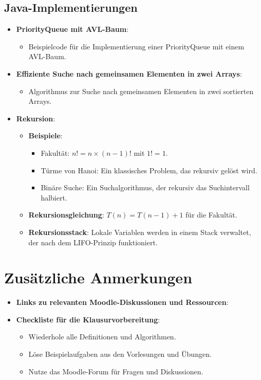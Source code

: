 \documentclass[a4paper,12pt]{article}
\begin{document}
\subsection{Java-Implementierungen}
\begin{itemize}
    \item \textbf{PriorityQueue mit AVL-Baum}:
    \begin{itemize}
        \item Beispielcode für die Implementierung einer PriorityQueue mit einem AVL-Baum.
    \end{itemize}
    \item \textbf{Effiziente Suche nach gemeinsamen Elementen in zwei Arrays}:
    \begin{itemize}
        \item Algorithmus zur Suche nach gemeinsamen Elementen in zwei sortierten Arrays.
    \end{itemize}
    \item \textbf{Rekursion}:
    \begin{itemize}
        \item \textbf{Beispiele}:
        \begin{itemize}
            \item Fakultät: \( n! = n \times (n-1)! \) mit \( 1! = 1 \).
            \item Türme von Hanoi: Ein klassisches Problem, das rekursiv gelöst wird.
            \item Binäre Suche: Ein Suchalgorithmus, der rekursiv das Suchintervall halbiert.
        \end{itemize}
        \item \textbf{Rekursionsgleichung}: \( T(n) = T(n-1) + 1 \) für die Fakultät.
        \item \textbf{Rekursionsstack}: Lokale Variablen werden in einem Stack verwaltet, der nach dem LIFO-Prinzip funktioniert.
    \end{itemize}
\end{itemize}

\vspace{1em} 

\section{Zusätzliche Anmerkungen}
\begin{itemize}
    \item \textbf{Links zu relevanten Moodle-Diskussionen und Ressourcen}:
    \item \textbf{Checkliste für die Klausurvorbereitung}:
    \begin{itemize}
        \item Wiederhole alle Definitionen und Algorithmen.
        \item Löse Beispielaufgaben aus den Vorlesungen und Übungen.
        \item Nutze das Moodle-Forum für Fragen und Diskussionen.
    \end{itemize}
\end{itemize}
\end{document}

